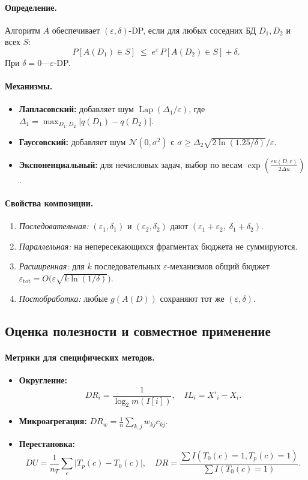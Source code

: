 \documentclass[areasetadvanced]{scrartcl}
\DeclareMathOperator{\Lap}{Lap}
\newcommand{\rmtot}{\mathrm{tot}}
\begin{document}
\paragraph{Определение.}  
Алгоритм $A$ обеспечивает $(\varepsilon,\delta)$-DP, если для любых соседних БД $D_1,D_2$ и всех $S$:
\[
  P[A(D_1)\in S]\;\le\;e^\varepsilon\,P[A(D_2)\in S]+\delta.
\]
При $\delta=0$—$\varepsilon$-DP.

\paragraph{Механизмы.}
\begin{itemize}
  \item \textbf{Лапласовский:} добавляет шум $\Lap(\Delta_1/\varepsilon)$, где
    $\Delta_1=\max_{D_1,D_2}|q(D_1)-q(D_2)|$.
  \item \textbf{Гауссовский:} добавляет шум $\mathcal N(0,\sigma^2)$ с
    $\sigma\ge \Delta_2\sqrt{2\ln(1.25/\delta)}/\varepsilon$.
  \item \textbf{Экспоненциальный:} для нечисловых задач, выбор по весам $\exp(\frac{\varepsilon u(D,r)}{2\Delta u})$.
\end{itemize}

\paragraph{Свойства композиции.}
\begin{enumerate}
  \item \emph{Последовательная:} $(\varepsilon_1,\delta_1)$ и $(\varepsilon_2,\delta_2)$ дают $(\varepsilon_1+\varepsilon_2,\;\delta_1+\delta_2)$.
  \item \emph{Параллельная:} на непересекающихся фрагментах бюджета не суммируются.
  \item \emph{Расширенная:} для $k$ последовательных $\varepsilon$-механизмов общий бюджет
    \(\displaystyle \varepsilon_{\rmtot}=O\bigl(\varepsilon\sqrt{k\ln(1/\delta)}\bigr)\).
  \item \emph{Постобработка:} любые $g(A(D))$ сохраняют тот же $(\varepsilon,\delta)$.
\end{enumerate}

\subsection{Оценка полезности и совместное применение}

\paragraph{Метрики для специфических методов.}
\begin{itemize}
  \item \textbf{Округление:} 
    \[
      DR_i=\frac1{\log_2 m(I[i])},\quad
      IL_i=X'_i-X_i.
    \]
  \item \textbf{Микроагрегация:} 
    \(\displaystyle DR_w=\frac1n\sum_{k,j}w_{kj}c_{kj}.\)
  \item \textbf{Перестановка:} 
    \[
      DU=\frac1{n_T}\sum_c\bigl|T_p(c)-T_0(c)\bigr|,\quad
      DR=\frac{\sum I(T_0(c)=1,T_p(c)=1)}{\sum I(T_0(c)=1)}.
    \]
\end{itemize}
\end{document}
